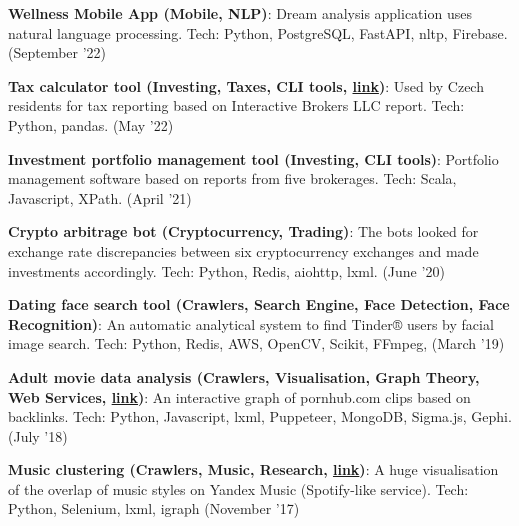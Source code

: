 \documentclass[a4paper,20pt]{article}
\newcommand{\resumeItem}[2]{
  \item\small{
    \textbf{#1}{: #2 \vspace{-2pt}}
  }
}
\newcommand{\resumeSubItem}[2]{\resumeItem{#1}{#2}\vspace{-3pt}}
\newcommand{\padding}{\vspace{2pt}}
\begin{document}
    \resumeSubItem{Wellness Mobile App (Mobile, NLP)}{Dream analysis application uses natural language processing. Tech: Python, PostgreSQL, FastAPI, nltp, Firebase. (September '22)}
    \padding

    \resumeSubItem{Tax calculator tool (Investing, Taxes, CLI tools, \href{https://github.com/esemi/investments/tree/devel\#investments}{link})}{Used by Czech residents for tax reporting based on Interactive Brokers LLC report. Tech: Python, pandas. (May '22)}
    \padding

    \resumeSubItem{Investment portfolio management tool (Investing, CLI tools)}{Portfolio management software based on reports from five brokerages. Tech: Scala, Javascript, XPath. (April '21)}
    \padding

    \resumeSubItem{Crypto arbitrage bot (Cryptocurrency, Trading)}{The bots looked for exchange rate discrepancies between six cryptocurrency exchanges and made investments accordingly. Tech: Python, Redis, aiohttp, lxml. (June '20)}
    \padding

    \resumeSubItem{Dating face search tool (Crawlers, Search Engine, Face Detection, Face Recognition)}{An automatic analytical system to find Tinder® users by facial image search. Tech: Python, Redis, AWS, OpenCV, Scikit, FFmpeg, (March '19)}
    \padding

    \resumeSubItem{Adult movie data analysis (Crawlers, Visualisation, Graph Theory, Web Services, \href{https://esemi.github.io/pornhub-graph/}{link})}{An interactive graph of pornhub.com clips based on backlinks. Tech: Python, Javascript, lxml, Puppeteer, MongoDB, Sigma.js, Gephi. (July '18)}
    \padding

    \resumeSubItem{Music clustering (Crawlers, Music, Research, \href{https://habr.com/ru/company/semrush/blog/337216/}{link})}{A huge visualisation of the overlap of music styles on Yandex Music (Spotify-like service). Tech: Python, Selenium, lxml, igraph (November '17)}
    \padding


\end{document}

